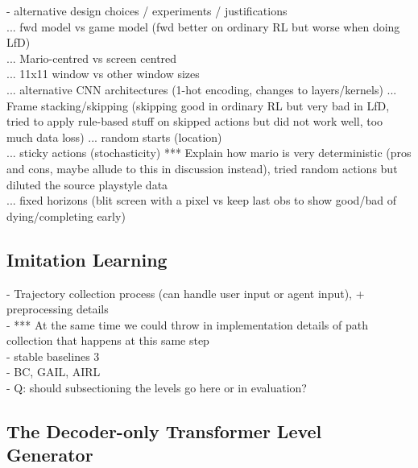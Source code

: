 \documentclass[letterpaper]{article} %
\begin{document}
- alternative design choices / experiments / justifications\\
    ... fwd model vs game model (fwd better on ordinary RL but worse when doing LfD)\\
    ... Mario-centred vs screen centred\\
    ... 11x11 window vs other window sizes\\
    ... alternative CNN architectures (1-hot encoding, changes to layers/kernels)
    ... Frame stacking/skipping (skipping good in ordinary RL but very bad in LfD, tried to apply rule-based stuff on skipped actions but did not work well, too much data loss)
    ... random starts (location)\\
    ... sticky actions (stochasticity) *** Explain how mario is very deterministic (pros and cons, maybe allude to this in discussion instead), tried random actions but diluted the source playstyle data\\
    ... fixed horizons (blit screen with a pixel vs keep last obs to show good/bad of dying/completing early)\\
    
\subsection{Imitation Learning}
- Trajectory collection process (can handle user input or agent input), + preprocessing details\\
- *** At the same time we could throw in implementation details of path collection that happens at this same step\\
- stable baselines 3\\
- BC, GAIL, AIRL\\
- Q: should subsectioning the levels go here or in evaluation?

\subsection{The Decoder-only Transformer Level Generator}
\end{document}
